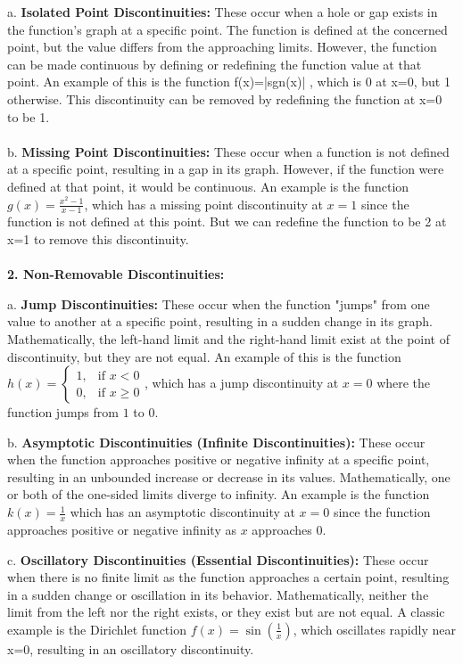   a. \textbf{Isolated Point Discontinuities:} These occur when a hole or gap exists in the function's graph at a specific point. The function is defined at the concerned point, but the value differs from the approaching limits. However, the function can be made continuous by defining or redefining the function value at that point. An example of this is the function f(x)=|sgn(x)| , which is 0 at x=0, but 1 otherwise. This discontinuity can be removed by redefining the function at x=0 to be 1.    \\\\
   b. \textbf{Missing Point Discontinuities:} These occur when a function is not defined at a specific point, resulting in a gap in its graph. However, if the function were defined at that point, it would be continuous. An example is the function \( g(x) = \frac{x^2-1}{x-1} \), which has a missing point discontinuity at \( x = 1 \) since the function is not defined at this point. But we can redefine the function to be 2 at x=1 to remove this discontinuity.\\\\

\textbf{2. Non-Removable Discontinuities:}

   a. \textbf{Jump Discontinuities:} These occur when the function "jumps" from one value to another at a specific point, resulting in a sudden change in its graph. Mathematically, the left-hand limit and the right-hand limit exist at the point of discontinuity, but they are not equal. An example of this is the function \( h(x) = \begin{cases} 1, & \text{if } x < 0 \\ 0, & \text{if } x \geq 0 \end{cases} \), which has a jump discontinuity at \( x = 0 \) where the function jumps from \( 1 \) to \( 0 \).

   b. \textbf{Asymptotic Discontinuities (Infinite Discontinuities):} These occur when the function approaches positive or negative infinity at a specific point, resulting in an unbounded increase or decrease in its values. Mathematically, one or both of the one-sided limits diverge to infinity. An example is the function \( k(x) = \frac{1}{x} \) which has an asymptotic discontinuity at \( x = 0 \) since the function approaches positive or negative infinity as \( x \) approaches \( 0 \).

   c. \textbf{Oscillatory Discontinuities (Essential Discontinuities):} These occur when there is no finite limit as the function approaches a certain point, resulting in a sudden change or oscillation in its behavior. Mathematically, neither the limit from the left nor the right exists, or they exist but are not equal. A classic example is the Dirichlet function \(f(x)=\sin(\frac{1}{x})\), which oscillates rapidly near x=0, resulting in an oscillatory discontinuity.



